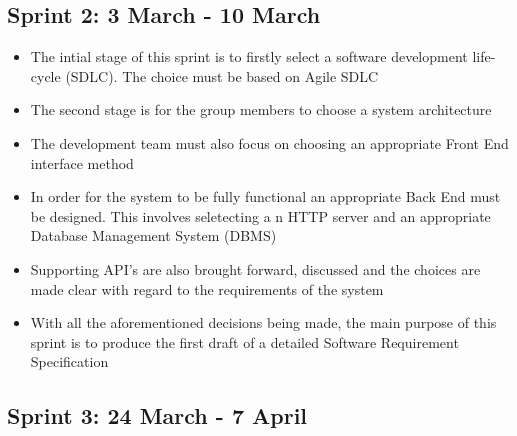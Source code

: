 \documentclass[10pt, a4paper, onecolumn]{scrartcl}
\begin{document}
		\subsection{Sprint 2: 3 March - 10 March}
		
			\begin{itemize}[noitemsep]
				\item The intial stage of this sprint is to firstly select a software development life-cycle (SDLC). The choice must be based on Agile SDLC
				\item The second stage is for the group members to choose a system architecture
				\item The development team must also focus on choosing an appropriate Front End interface method
				\item In order for the system to be fully functional an appropriate Back End must be designed. This involves seletecting a n HTTP server and an appropriate Database Management System (DBMS)
				\item Supporting API's are also brought forward, discussed and the choices are made clear with regard to the requirements of the system
				\item With all the aforementioned decisions being made, the main purpose of this sprint is to produce the first draft of a detailed Software Requirement Specification
				
			\end{itemize}
		
		\subsection{Sprint 3: 24 March - 7 April}
		
		
			
			
	
	
\end{document}
